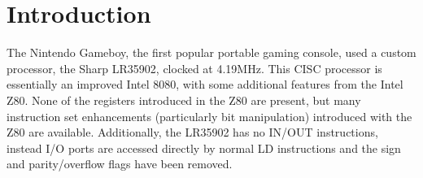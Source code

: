 \section{Introduction}

The Nintendo Gameboy, the first popular portable gaming console, used a custom processor, the Sharp LR35902, clocked at 4.19MHz.  This CISC processor is essentially an improved Intel 8080, with some additional features from the Intel Z80.  None of the registers introduced in the Z80 are present, but many instruction set enhancements (particularly bit manipulation) introduced with the Z80 are available.  Additionally, the LR35902 has no IN/OUT instructions, instead I/O ports are accessed directly by normal LD instructions and the sign and parity/overflow flags have been removed.